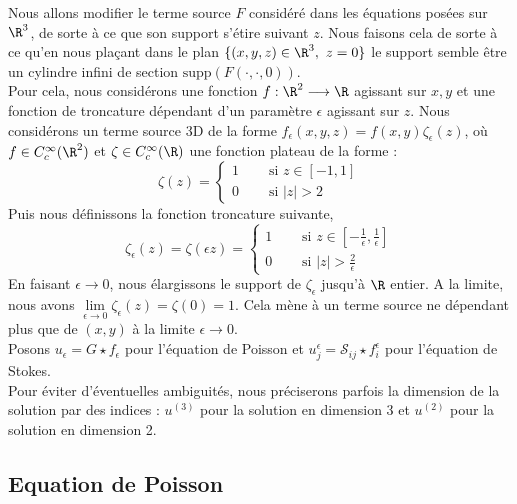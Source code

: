 Nous allons modifier le terme source $F$ considéré dans les équations posées sur $\R^3$, de sorte à ce que son support s'étire suivant $z$. Nous faisons cela de sorte à ce qu'en nous plaçant dans le plan $\{ (x,y,z) \in \R^3, \ z = 0 \}$ le support semble être un cylindre infini de section $\text{supp}(F(\cdot,\cdot,0))$. \\ 
Pour cela, nous considérons une fonction $f : \R^2 \longrightarrow \R $ agissant sur $x,y$ et une fonction de troncature dépendant d'un paramètre $\epsilon$ agissant sur $z$.
Nous considérons un terme source 3D de la forme $f_{\epsilon}(x,y,z) = f(x,y)\zeta_{\epsilon}(z) $, où $f \in C^{\infty}_c(\R^2)$ et $\zeta \in C^{\infty}_c(\R) $ une fonction plateau de la forme :
$$ \zeta(z) = \begin{cases}
    1 \quad &\text{ si } z \in [-1,1] \\
    0 &\text{ si } |z| > 2
\end{cases}$$
Puis nous définissons la fonction troncature suivante, 
$$ \zeta_{\epsilon}(z) = \zeta ( \epsilon z) = \begin{cases}
    1 \quad &\text{ si } z \in [-\frac{1}{\epsilon},\frac{1}{\epsilon}] \\
    0 &\text{ si } |z| > \frac{2}{\epsilon}
\end{cases} $$
En faisant $\epsilon \to 0$, nous élargissons le support de $\zeta_{\epsilon}$ jusqu'à $\R$ entier. A la limite, nous avons $\displaystyle \underset{\epsilon \to 0}{\lim} \zeta_{\epsilon} (z) = \zeta(0) = 1 $.
Cela mène à un terme source ne dépendant plus que de $(x,y)$ à la limite $\epsilon \to 0$. \\
Posons $u_{\epsilon} = G \star f_{\epsilon} $ pour l'équation de Poisson et $u^{\epsilon}_{j} = \mathscr{S}_{ij} \star f_i^{\epsilon} $ pour l'équation de Stokes.\\
Pour éviter d'éventuelles ambiguités, nous préciserons parfois la dimension de la solution par des indices : $u^{(3)}$ pour la solution en dimension 3 et $u^{(2)}$ pour la solution en dimension 2.

\subsection{Equation de Poisson}

